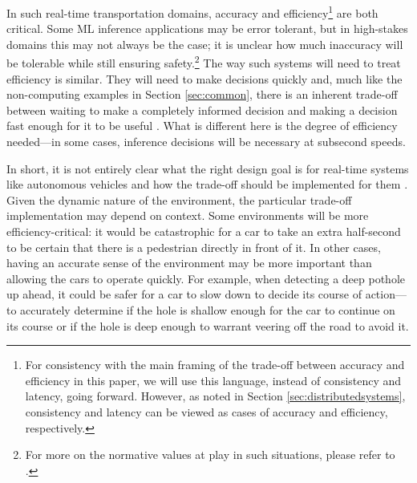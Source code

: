 \documentclass[sigplan,screen]{acmart}
\begin{document}
In such real-time transportation domains, accuracy and efficiency\footnote{For consistency with the main framing of the trade-off between accuracy and efficiency in this paper, we will use this language, instead of consistency and latency, going forward. However, as noted in Section \ref{sec:distributedsystems}, consistency and latency can be viewed as cases of accuracy and efficiency, respectively.} are both critical. Some ML inference applications may be error tolerant, but in high-stakes domains this may not always be the case; it is unclear how much inaccuracy will be tolerable while still ensuring safety.\footnote{For more on the normative values at play in such situations, please refer to \citet{cooper2020law}.} The way such systems will need to treat efficiency is similar. They will need to make decisions quickly and, much like the non-computing examples in Section \ref{sec:common}, there is an inherent trade-off between waiting to make a completely informed decision and making a decision fast enough for it to be useful \cite{Abadi2012tradeoff, Brewer12computer}. What is different here is the degree of efficiency needed---in some cases, inference decisions will be necessary at subsecond speeds.

In short, it is not entirely clear what the right design goal is for real-time systems like autonomous vehicles and how the trade-off should be implemented for them \cite{Dietterich2018robustAI}. Given the dynamic nature of the environment, the particular trade-off implementation may depend on context. Some environments will be more efficiency-critical: it would be catastrophic for a car to take an extra half-second to be certain that there is a pedestrian directly in front of it. In other cases, having an accurate sense of the environment may be more important than allowing the cars to operate quickly. For example, when detecting a deep pothole up ahead, it could be safer for a car to slow down to decide its course of action---to accurately determine if the hole is shallow enough for the car to continue on its course or if the hole is deep enough to warrant veering off the road to avoid it.
\end{document}
